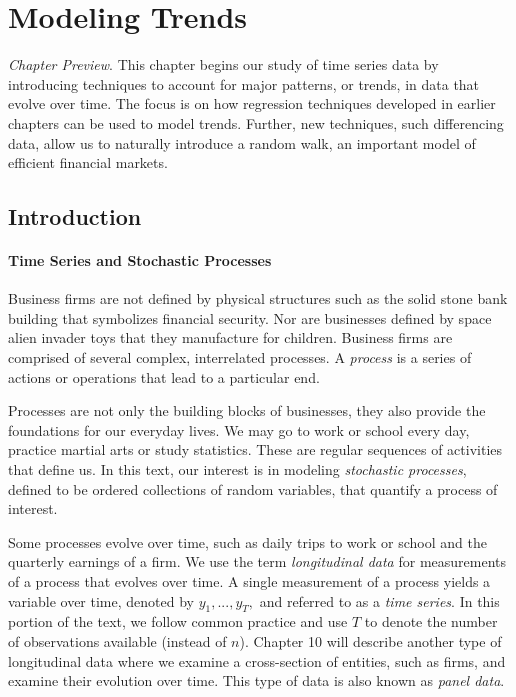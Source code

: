 \setcounter{chapter}{6}
\chapter{Modeling Trends}
{\small \textit{Chapter Preview}. This chapter begins our study of
time series data by introducing techniques to account for major
patterns, or trends, in data that evolve over time. The focus is on
how regression techniques developed in earlier chapters can be used
to model trends. Further, new techniques, such differencing data,
allow us to naturally introduce a random walk, an important model of
efficient financial markets.}


\section{Introduction}

\subsubsection*{Time Series and Stochastic Processes}

Business firms are not defined by physical structures such as the
solid stone bank building that symbolizes financial security. Nor
are businesses defined by space alien invader toys that they
manufacture for children. Business firms are comprised of several
complex, interrelated processes. A \emph{process} is a series of
actions or operations that lead to a particular end.

Processes are not only the building blocks of businesses, they also
provide the foundations for our everyday lives. We may go to work or
school every day, practice martial arts or study statistics. These
are regular sequences of activities that define us. In this text,
our interest is in modeling  \emph{stochastic processes}, defined to
be ordered collections of random variables, that quantify a process
of interest.


Some processes evolve over time, such as daily trips to work or
school and the quarterly earnings of a firm. We use the term
\emph{longitudinal data} for measurements of a process that evolves
over time. A
single measurement of a process yields a variable over time, denoted
by $y_1,...,y_T,$ and referred to as a \emph{time series}.
In this portion of
the text, we follow common practice and use $T$ to denote the number
of observations available (instead of $n$). Chapter 10 will describe
another type of longitudinal data where we examine a cross-section
of entities, such as firms, and examine their evolution over time.
This type of data is also known as \emph{panel data}.

